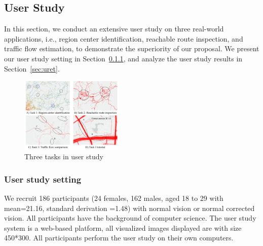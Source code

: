 \subsection{User Study}\label{sec:user}
In this section, we conduct an extensive user study on three real-world applications, i.e., region center identification, reachable route inspection, and traffic flow estimation, to demonstrate the superiority of our proposal.
We present our user study setting in Section~\ref{sec:uset}, and analyze the user study results in Section~\ref{sec:uret}.



\begin{figure}[t]
	\centering
	\includegraphics[width=0.44\textwidth]{pictures/user_study/interface.pdf}
	\vspace{-3mm}
	\caption{Three tasks in user study}
	\label{fig:apps}
	\vspace{-6mm}
\end{figure}

\subsubsection{User study setting}\label{sec:uset}

We recruit 186 participants (24 females, 162 males, aged 18 to 29 with mean=21.16, standard derivation =1.48) with normal vision or normal corrected vision.
All participants have the background of computer science.
The user study system is a web-based platform, all visualized images displayed are with size 450*300.
All participants perform the user study on their own computers.


